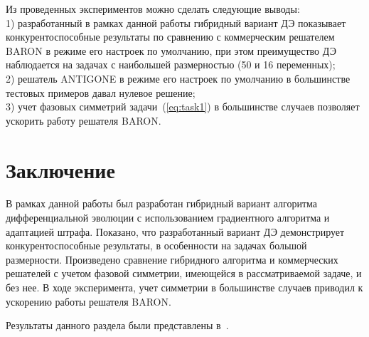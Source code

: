 Из проведенных экспериментов можно сделать следующие выводы:\\
1) разработанный в рамках данной работы гибридный вариант ДЭ показывает конкурентоспособные результаты по сравнению с коммерческим решателем BARON в режиме его настроек по умолчанию, при этом преимущество ДЭ наблюдается на задачах с наибольшей размерностью (50 и 16 переменных);\\
2) решатель ANTIGONE в режиме его настроек по умолчанию в большинстве тестовых примеров давал нулевое решение;\\
3) учет фазовых симметрий задачи~(\ref{eq:task1}) в большинстве случаев позволяет ускорить работу решателя BARON.\\

\section{Заключение}\label{sec:conclusion}

В рамках данной работы был разработан гибридный вариант алгоритма дифференциальной эволюции с использованием
градиентного алгоритма и адаптацией штрафа. Показано, что разработанный вариант ДЭ демонстрирует конкурентоспособные результаты, в
особенности на задачах большой размерности. Произведено сравнение гибридного алгоритма и коммерческих решателей с
учетом фазовой симметрии, имеющейся в рассматриваемой задаче, и без нее. В ходе эксперимента, учет симметрии в большинстве
случаев приводил к ускорению работы решателя BARON.

Результаты данного раздела были представлены в~\cite{tyu:msim22,tyu:reis}.
